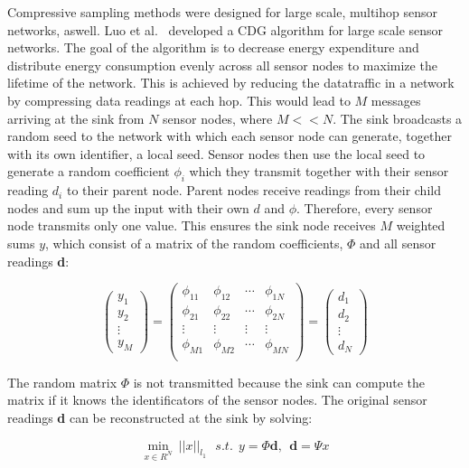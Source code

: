Compressive sampling methods were designed for large scale, multihop sensor
networks, aswell. Luo et al.~\cite{luo2009compressive} developed a \ac{CDG}
algorithm for large scale sensor networks. The goal of the algorithm is to
decrease energy expenditure and distribute energy consumption evenly across all
sensor nodes to maximize the lifetime of the network. This is achieved by
reducing the datatraffic in a network by compressing data readings at each hop.
This would lead to $ M $ messages arriving at the sink from $ N $ sensor nodes,
where $ M << N $. The sink broadcasts a random seed to the network with which
each sensor node can generate, together with its own identifier, a local seed.
Sensor nodes then use the local seed to generate a random coefficient $ \phi_i
$ which they transmit together with their sensor reading $ d_i $ to their
parent node. Parent nodes receive readings from their child nodes and sum up
the input with their own $ d $ and $ \phi $. Therefore, every sensor node
transmits only one value. This ensures the sink node receives $ M $ weighted
sums $ y $, which consist of a matrix of the random coefficients, $ \Phi $ and
all sensor readings \textbf{d}:

$$
\begin{pmatrix}
    y_1 \\
    y_2 \\
    \vdots \\
    y_M
\end{pmatrix}
=
\begin{pmatrix}
    \phi_{11} & \phi_{12} & \dotsb & \phi_{1N}\\
    \phi_{21} & \phi_{22} & \dotsb & \phi_{2N}\\
    \vdots & \vdots & \vdots & \vdots\\
    \phi_{M1} & \phi_{M2} & \dotsb & \phi_{MN}\\
\end{pmatrix}
=
\begin{pmatrix}
    d_1 \\
    d_2 \\
    \vdots \\
    d_N
\end{pmatrix}
$$

The random matrix $ \Phi $ is not transmitted because the sink can compute the
matrix if it knows the identificators of the sensor nodes. The original
sensor readings \textbf{d} can be reconstructed at the sink by solving:

$$
\displaystyle{\min_{x\in R^N} \ ||x||_{l_1}}  \ \ \   s.t.  \ \  y = \Phi \textbf{d} , \ \ 
\textbf{d}  = \Psi x
$$

